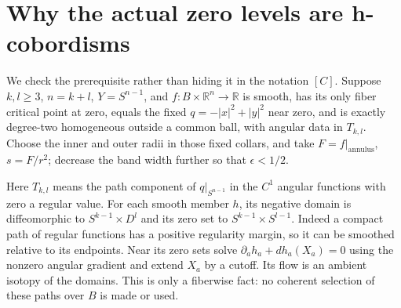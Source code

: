 \documentclass[11pt]{article}
\newcommand{\R}{\mathbb R}
\begin{document}
\section{Why the actual zero levels are h-cobordisms}

We check the prerequisite rather than hiding it in the notation $[C]$.
Suppose $k,l\geq3$, $n=k+l$, $Y=S^{n-1}$, and
$f:B\times\R^n\to\R$ is smooth, has its only fiber critical point at
zero, equals the fixed $q=-|x|^2+|y|^2$ near zero, and is exactly
degree-two homogeneous outside a common ball, with angular data in
$T_{k,l}$. Choose the inner and outer radii in those fixed collars,
and take $F=f|_{\text{annulus}}$, $s=F/r^2$; decrease the band width
further so that $\epsilon<1/2$.

Here $T_{k,l}$ means the path component of $q|_{S^{n-1}}$ in the
$C^1$ angular functions with zero a regular value. For each smooth
member $h$, its negative domain is diffeomorphic to
$S^{k-1}\times D^l$ and its zero set to
$S^{k-1}\times S^{l-1}$. Indeed a compact path of regular functions
has a positive regularity margin, so it can be smoothed relative to
its endpoints. Near its zero sets solve
$\partial_a h_a+dh_a(X_a)=0$ using the nonzero angular gradient and
extend $X_a$ by a cutoff. Its flow is an ambient isotopy of the
domains. This is only a fiberwise fact: no coherent selection of
these paths over $B$ is made or used.
\end{document}
